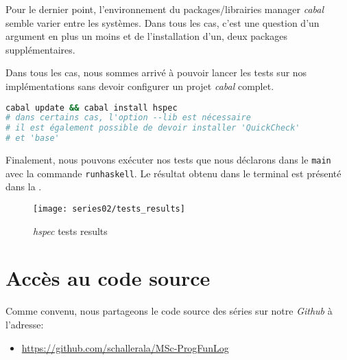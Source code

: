 Pour le dernier point, l'environnement du packages/librairies manager \emph{cabal} semble varier entre les systèmes.
Dans tous les cas, c'est une question d'un argument en plus un moins et de l'installation d'un, deux packages supplémentaires.

Dans tous les cas, nous sommes arrivé à pouvoir lancer les tests sur nos implémentations sans
devoir configurer un projet \emph{cabal} complet.

\begin{lstlisting}[language=bash,caption={Installation du package \emph{hspec}}]
cabal update && cabal install hspec
# dans certains cas, l'option --lib est nécessaire
# il est également possible de devoir installer 'QuickCheck'
# et 'base'
\end{lstlisting}

Finalement, nous pouvons exécuter nos tests que nous déclarons dans le \texttt{main} avec la commande \texttt{runhaskell}.
Le résultat obtenu dans le terminal est présenté dans la .

\begin{figure}[H]
    \center
    \texttt{[image: series02/tests\_results]}
    \caption{\emph{hspec} tests results\label{fig:tests_results}}
\end{figure}

%
%
\section*{Accès au code source}
Comme convenu, nous partageons le code source des séries sur notre \emph{Github} à l'adresse:
\begin{itemize}
    \item \url{https://github.com/schallerala/MSc-ProgFunLog}
\end{itemize}








